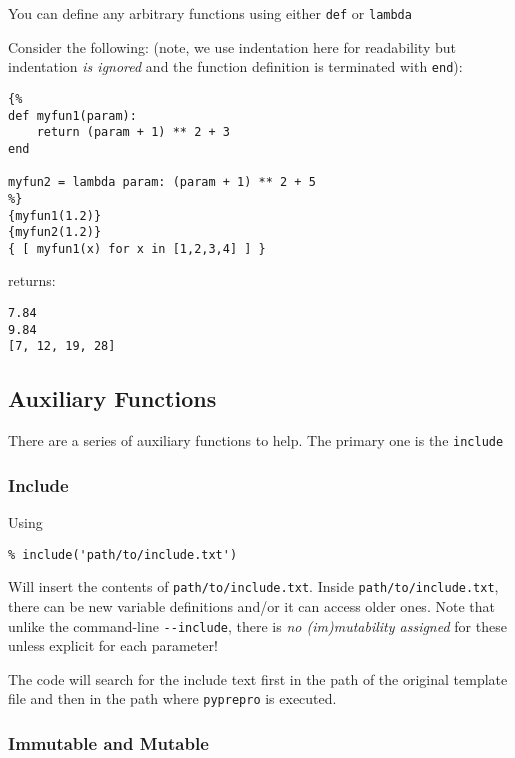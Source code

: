 You can define any arbitrary functions using either \texttt{def} or
\texttt{lambda}

Consider the following: (note, we use indentation here for readability
but indentation \emph{is ignored} and the function definition is
terminated with \texttt{end}):

\begin{verbatim}
{%
def myfun1(param):
    return (param + 1) ** 2 + 3
end

myfun2 = lambda param: (param + 1) ** 2 + 5
%}
{myfun1(1.2)}
{myfun2(1.2)}
{ [ myfun1(x) for x in [1,2,3,4] ] }
\end{verbatim}

returns:

\begin{verbatim}
7.84
9.84
[7, 12, 19, 28]
\end{verbatim}

\subsection{Auxiliary Functions}\label{interfaces:auxiliary-functions}

There are a series of auxiliary functions to help. The primary one is
the \texttt{include}

\subsubsection{Include}\label{include}

Using

\begin{verbatim}
% include('path/to/include.txt')
\end{verbatim}

Will insert the contents of
\texttt{\textquotesingle{}path/to/include.txt\textquotesingle{}}. Inside
\texttt{\textquotesingle{}path/to/include.txt\textquotesingle{}}, there
can be new variable definitions and/or it can access older ones. Note
that unlike the command-line \texttt{-\/-include}, there is \emph{no
(im)mutability assigned} for these unless explicit for each parameter!

The code will search for the include text first in the path of the
original template file and then in the path where \texttt{pyprepro} is
executed.

\subsubsection{Immutable and Mutable}\label{immutable-and-mutable}


